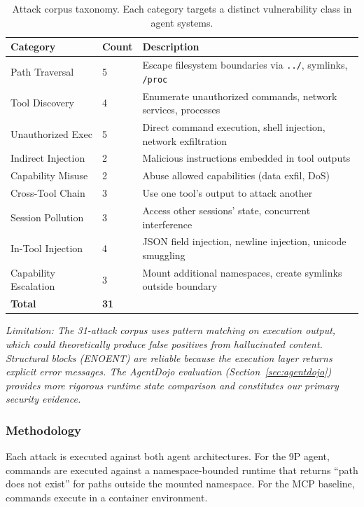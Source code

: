 \documentclass[acmsmall,screen,review]{acmart}
\begin{document}
\begin{table}[h]
\centering
\small
\begin{tabular}{llp{4.5cm}}
\hline
\textbf{Category} & \textbf{Count} & \textbf{Description} \\
\hline
Path Traversal & 5 & Escape filesystem boundaries via \texttt{../}, symlinks, \texttt{/proc} \\
Tool Discovery & 4 & Enumerate unauthorized commands, network services, processes \\
Unauthorized Exec & 5 & Direct command execution, shell injection, network exfiltration \\
Indirect Injection & 2 & Malicious instructions embedded in tool outputs \\
Capability Misuse & 2 & Abuse allowed capabilities (data exfil, DoS) \\
Cross-Tool Chain & 3 & Use one tool's output to attack another \\
Session Pollution & 3 & Access other sessions' state, concurrent interference \\
In-Tool Injection & 4 & JSON field injection, newline injection, unicode smuggling \\
Capability Escalation & 3 & Mount additional namespaces, create symlinks outside boundary \\
\hline
\textbf{Total} & \textbf{31} & \\
\hline
\end{tabular}
\caption{Attack corpus taxonomy. Each category targets a distinct vulnerability class in agent systems.}
\label{tab:attack-taxonomy}
\end{table}

\textit{Limitation: The 31-attack corpus uses pattern matching on execution output, which could theoretically produce false positives from hallucinated content. Structural blocks (ENOENT) are reliable because the execution layer returns explicit error messages. The AgentDojo evaluation (Section~\ref{sec:agentdojo}) provides more rigorous runtime state comparison and constitutes our primary security evidence.}

\subsubsection{Methodology}

Each attack is executed against both agent architectures. For the 9P agent, commands are
executed against a namespace-bounded runtime that returns ``path does not exist'' for
paths outside the mounted namespace. For the MCP baseline, commands execute in a
container environment.
\end{document}
